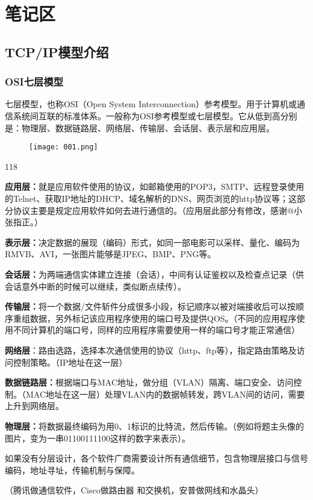 \documentclass[cn,chinese,color=cyan]{elegantbook}
\begin{document}
\chapter{笔记区}
\section{TCP/IP模型介绍}

\subsection{OSI七层模型}
七层模型，也称OSI（Open System Interconnection）参考模型。用于计算机或通信系统间互联的标准体系。一般称为OSI参考模型或七层模型。它从低到高分别是：物理层、数据链路层、网络层、传输层、会话层、表示层和应用层。
\begin{figure}[H]
	\centering
	\texttt{[image: 001.png]}
\end{figure}
\begin{dinglist}{118}
	\item \textbf{应用层：}就是应用软件使用的协议，如邮箱使用的POP3，SMTP、远程登录使用的Telnet、获取IP地址的DHCP、域名解析的DNS、网页浏览的http协议等；这部分协议主要是规定应用软件如何去进行通信的。（应用层此部分有修改，感谢@小张指正。）
	
	 \item \textbf{表示层：}决定数据的展现（编码）形式，如同一部电影可以采样、量化、编码为RMVB、AVI，一张图片能够是JPEG、BMP、PNG等。
	 
	 \item \textbf{会话层：}为两端通信实体建立连接（会话），中间有认证鉴权以及检查点记录（供会话意外中断的时候可以继续，类似断点续传）。
	 
	 \item \textbf{传输层：}将一个数据/文件斩件分成很多小段，标记顺序以被对端接收后可以按顺序重组数据，另外标记该应用程序使用的端口号及提供QOS。（不同的应用程序使用不同计算机的端口号，同样的应用程序需要使用一样的端口号才能正常通信）
	 
	 \item \textbf{网络层}：路由选路，选择本次通信使用的协议（http、ftp等），指定路由策略及访问控制策略。（IP地址在这一层）
	 
	 \item \textbf{数据链路层：}根据端口与MAC地址，做分组（VLAN）隔离、端口安全、访问控制。（MAC地址在这一层）处理VLAN内的数据帧转发，跨VLAN间的访问，需要上升到网络层。
	 
	 \item \textbf{物理层：}将数据最终编码为用0、1标识的比特流，然后传输。（例如将题主头像的图片，变为一串01100111100这样的数字来表示）。
\end{dinglist}
\begin{warning}[title={{\color{green} \faEnvira} 为什么需要分层设计：\ }]
	如果没有分层设计，各个软件广商需要设计所有通信细节，包含物理层接口与信号编码，地址寻址，传输机制与保障。
	
	（腾讯做通信软件，Cisco做路由器 和交换机，安普做网线和水晶头）
\end{warning}
\end{document}
